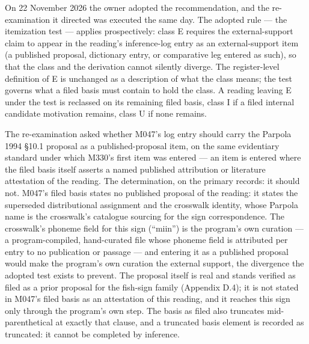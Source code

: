 \documentclass[11pt]{article}
\newcounter{none} %
\begin{document}
On 22 November 2026 the owner adopted the recommendation, and
the re-examination it directed was executed the same day. The
adopted rule --- the itemization test --- applies
prospectively: class E requires the external-support claim to
appear in the reading's inference-log entry as an
external-support item (a published proposal, dictionary entry,
or comparative leg entered as such), so that the class and the
derivation cannot silently diverge. The register-level
definition of E is unchanged as a description of what the class
means; the test governs what a filed basis must contain to hold
the class. A reading leaving E under the test is reclassed on
its remaining filed basis, class I if a filed internal
candidate motivation remains, class U if none remains.

The re-examination asked whether M047's log entry should carry
the Parpola 1994 §10.1 proposal as a published-proposal item, on
the same evidentiary standard under which M330's first item was
entered --- an item is entered where the filed basis itself
asserts a named published attribution or literature attestation
of the reading. The determination, on the primary records: it
should not. M047's filed basis states no published proposal of
the reading: it states the superseded distributional assignment
and the crosswalk identity, whose Parpola name is the
crosswalk's catalogue sourcing for the sign correspondence. The
crosswalk's phoneme field for this sign (``miin'') is the
program's own curation --- a program-compiled, hand-curated
file whose phoneme field is attributed per entry to no
publication or passage --- and entering it as a published
proposal would make the program's own curation the external
support, the divergence the adopted test exists to prevent. The
proposal itself is real and stands verified as filed as a prior
proposal for the fish-sign family (Appendix D.4); it is not
stated in M047's filed basis as an attestation of this reading,
and it reaches this sign only through the program's own step.
The basis as filed also truncates mid-parenthetical at exactly
that clause, and a truncated basis element is recorded as
truncated: it cannot be completed by inference.
\end{document}
